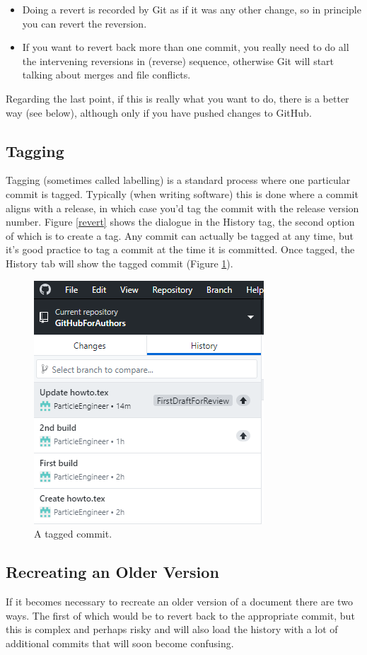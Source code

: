 \documentclass[a4paper, 12pt]{article}
\begin{document}
\begin{itemize}
\item Doing a revert is recorded by Git as if it was any other change, so in principle you can revert the reversion.
\item If you want to revert back more than one commit, you really need to do all the intervening reversions in (reverse) sequence, otherwise Git will start talking about merges and file conflicts.
\end{itemize}
Regarding the last point, if this is really what you want to do, there is a better way (see below), although only if you have pushed changes to GitHub.

\subsection{Tagging}
Tagging (sometimes called labelling) is a standard process where one particular commit is tagged. Typically (when writing software) this is done where a commit aligns with a release, in which case you'd tag the commit with the release version number. Figure \ref{revert} shows the dialogue in the History tag, the second option of which is to create a tag. Any commit can actually be tagged at any time, but it's good practice to tag a commit at the time it is committed. Once tagged, the History tab will show the tagged commit (Figure \ref{tag}).

\begin{figure}
\centering
\includegraphics{Tag}
\caption{A tagged commit.}
\label{tag}
\end{figure}

\subsection{Recreating an Older Version}
If it becomes necessary to recreate an older version of a document there are two ways. The first of which would be to revert back to the appropriate commit, but this is complex and perhaps risky and will also load the history with a lot of additional commits that will soon become confusing.
\end{document}
